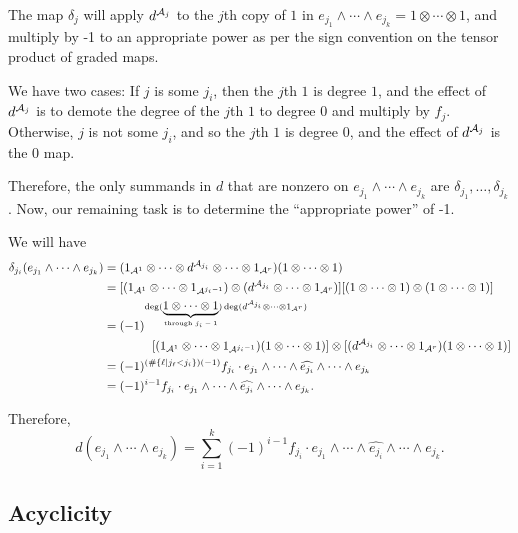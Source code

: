 \documentclass[12pt]{article}
\begin{document}
The map $\delta_j$ will apply $d^{\mathcal{A}_j}$ to the $j$th copy of $1$ in $e_{j_1}\wedge \cdots \wedge e_{j_k} = 1\otimes \cdots \otimes 1$, and multiply by -1 to an appropriate power as per the sign convention on the tensor product of graded maps.

We have two cases: If $j$ is some $j_i$, then the $j$th $1$ is degree $1$, and the effect of $d^{\mathcal{A}_j}$ is to demote the degree of the $j$th $1$ to degree $0$ and multiply by $f_j$. Otherwise, $j$ is not some $j_i$, and so the $j$th $1$ is degree 0, and the effect of $d^{\mathcal{A}_j}$ is the 0 map.

Therefore, the only summands in $d$ that are nonzero on $e_{j_1}\wedge \cdots \wedge e_{j_k}$ are $\delta_{j_1},\dots,\delta_{j_k}$. Now, our remaining task is to determine the ``appropriate power'' of -1.

We will have
\begin{align*}
    \delta_{j_i}(e_{j_1} \wedge \cdots \wedge e_{j_k}) &= (1_{\mathcal{A}^1}\otimes \cdots \otimes d^{\mathcal{A}_{j_i}} \otimes \cdots \otimes 1_{\mathcal{A}^r})(1\otimes \cdots \otimes 1)\\
    &= [(1_{\mathcal{A}^1}\otimes \cdots \otimes 1_{\mathcal{A}^{j_i-1}})\otimes (d^{\mathcal{A}_{j_i}}\otimes \cdots \otimes 1_{\mathcal{A}^r})][(1\otimes \cdots \otimes 1)\otimes (1\otimes \cdots \otimes 1)]\\
    &= (-1)^{\deg(\underbrace{1\otimes \cdots \otimes 1}_{\text{through $j_i-1$}})\deg(d^{\mathcal{A}_{j_i}}\otimes \cdots \otimes 1_{\mathcal{A}^r})} \\
    & \qquad\qquad[(1_{\mathcal{A}^1}\otimes \cdots \otimes 1_{\mathcal{A}^{j_i-1}})(1\otimes\cdots \otimes 1)] \otimes [(d^{\mathcal{A}_{j_i}}\otimes \cdots \otimes 1_{\mathcal{A}^r})(1\otimes \cdots \otimes 1)]\\
    &= (-1)^{(\#\{\ell | j_\ell < j_i\}) (-1)} f_{j_i} \cdot e_{j_1} \wedge \cdots \wedge \widehat{e_{j_i}} \wedge \cdots \wedge e_{j_k}\\
    &= (-1)^{i-1} f_{j_i} \cdot e_{j_1} \wedge \cdots \wedge \widehat{e_{j_i}} \wedge \cdots \wedge e_{j_k}.
\end{align*}

Therefore,
\begin{equation}\label{koszul_wedge}
    d(e_{j_1}\wedge \cdots \wedge e_{j_k}) = \sum_{i=1}^k (-1)^{i-1} f_{j_i} \cdot e_{j_1} \wedge \cdots \wedge \widehat{e_{j_i}} \wedge \cdots \wedge e_{j_k}.
\end{equation}

\subsection{Acyclicity}
\end{document}
